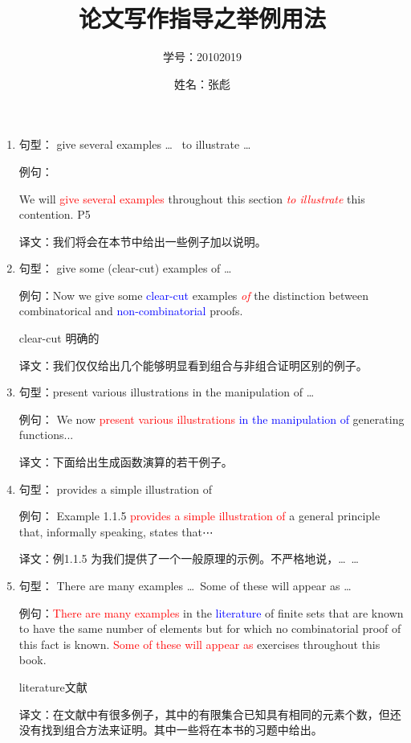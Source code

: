 \documentclass{ctexart}
\title{论文写作指导之{举例用法}}
\author{学号：20102019 }
\date{姓名：张彪}
\newcommand{\red}[1]{\textcolor{red}{#1}}
\newcommand{\blue}[1]{\textcolor{blue}{#1}}
\begin{document}
\maketitle


\begin{enumerate}


\item
句型： give several examples  \dots  ~ to illustrate \dots

例句：{We will \red{give several examples }throughout this section \emph{\red{to illustrate}} this contention.  P5
	
译文：我们将会在本节中给出一些例子加以说明。}

\item 
句型： give some  (clear-cut) examples  of \dots

例句：Now we give some \blue{ clear-cut} examples \emph{\red{of}} the distinction between combinatorical and \blue{non-combinatorial} proofs.

    clear-cut 明确的
    
译文：我们仅仅给出几个能够明显看到组合与非组合证明区别的例子。

\item 

句型：present various illustrations in the manipulation of  \dots

例句： We now \red{present various illustrations }\blue{in the manipulation of} generating functions...

译文：下面给出生成函数演算的若干例子。

\item 

句型： provides a simple illustration of




例句： Example 1.1.5 \red{provides a simple illustration of} a general principle that, informally speaking, states that⋯

译文：例1.1.5 为我们提供了一个一般原理的示例。不严格地说，\dots~\dots~


\item 

句型： There are many examples \dots~Some of these will appear as \dots~

例句：{\red{There are many examples}} in the \blue{literature} of finite sets that are known to have the same number of elements but for which no combinatorial proof of this fact is known. \red{Some of these will appear as} exercises throughout this book.

literature文献

译文：在文献中有很多例子，其中的有限集合已知具有相同的元素个数，但还没有找到组合方法来证明。其中一些将在本书的习题中给出。

\end{enumerate}

\end{document}
